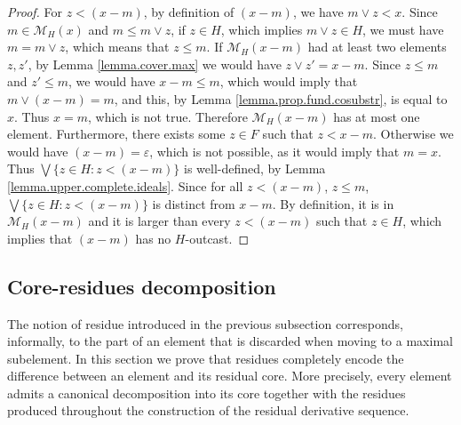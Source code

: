 \documentclass{article}
\begin{document}
\begin{proof}
     For $z < (x-m)$, by definition of $(x-m)$, we have $m \vee z < x$. Since $m \in \mathcal{M}_H(x)$ and $m \le m \vee z$, if $z \in H$, which implies $m \vee z \in H$, we must have $m = m \vee z$, which means that $z \le m$. If $\mathcal{M}_H(x - m)$ had at least two elements $z,z'$, by Lemma \ref{lemma.cover.max} we would have $z \vee z' = x-m$. Since $z \le m$ and $z' \le m$, we would have $x-m \le m$, which would imply that $m \vee (x-m) = m$, and this, by Lemma \ref{lemma.prop.fund.cosubstr}, is equal to $x$. Thus $x = m$, which is not true. Therefore $\mathcal{M}_H(x - m)$ has at most one element. Furthermore, there exists some $z \in F$ such that $z < x-m$. Otherwise we would have $(x-m) = \varepsilon$, which is not possible, as it would imply that $m = x$.     
     Thus $\bigvee \{z \in H : z < (x-m)\}$ is well-defined, by Lemma \ref{lemma.upper.complete.ideals}. Since for all $z < (x-m)$, $z \le m$, $\bigvee \{z \in H : z < (x-m)\}$ is distinct from $x-m$. By definition, it is in $\mathcal{M}_H(x-m)$ and it is larger than every $z < (x-m)$ such that $z \in H$, which implies that $(x-m)$ has no $H$-outcast.
\end{proof}

\subsection{\label{section.derivative.residue.decomposition}Core-residues decomposition}

The notion of residue introduced in the previous subsection {corresponds, informally, to}
the part of an element that is discarded when moving to a maximal subelement. In this section we prove that residues completely encode the difference between an element and its residual core. {More precisely, every element admits a canonical decomposition into its core together with the residues produced throughout the construction of the {residual derivative sequence}.}
\end{document}
